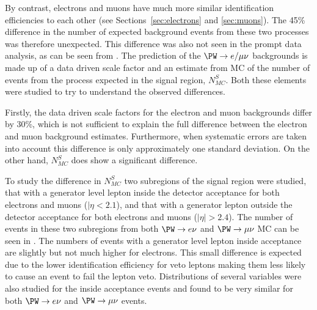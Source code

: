 By contrast, electrons and muons have much more similar identification efficiencies to each other (see Sections~\ref{sec:electrons} and \ref{sec:muons}). The 45\% difference in the number of expected background events from these two processes was therefore unexpected. This difference was also not seen in the prompt data analysis, as can be seen from . The prediction of the $\PW\rightarrow e/\mu\nu$ backgrounds is made up of a data driven scale factor and an estimate from \ac{MC} of the number of events from the process expected in the signal region, $N_{MC}^{S}$. Both these elements were studied to try to understand the observed differences.

Firstly, the data driven scale factors for the electron and muon backgrounds differ by 30\%, which is not sufficient to explain the full difference between the electron and muon background estimates. Furthermore, when systematic errors are taken into account this difference is only approximately one standard deviation. On the other hand, $N_{MC}^{S}$ does show a significant difference.

To study the difference in $N_{MC}^{S}$ two subregions of the signal region were studied, that with a generator level lepton inside the detector acceptance for both electrons and muons ($|\eta<2.1$), and that with a generator lepton outside the detector acceptance for both electrons and muons ($|\eta|>2.4$). The number of events in these two subregions from both $\PW\rightarrow e\nu$ and $\PW\rightarrow\mu\nu$ \ac{MC} can be seen in . The numbers of events with a generator level lepton inside acceptance are slightly but not much higher for electrons. This small difference is expected due to the lower identification efficiency for veto leptons making them less likely to cause an event to fail the lepton veto. Distributions of several variables were also studied for the inside acceptance events and found to be very similar for both $\PW\rightarrow e\nu$ and $\PW\rightarrow\mu\nu$ events.

